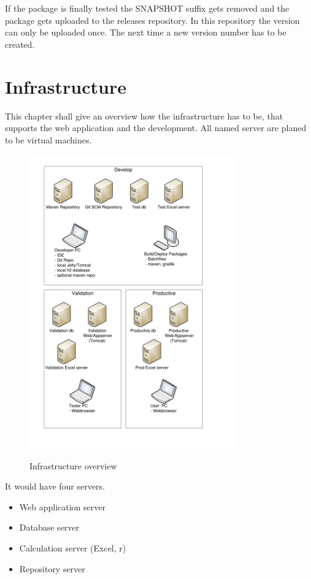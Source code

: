 \documentclass[paper=a4,twoside=false,BCOR=0mm,DIV=calc,fontsize=12pt]{scrartcl}
\begin{document}
If the package is finally tested the SNAPSHOT suffix gets removed and the package gets uploaded to the releases repository. In this repository the version can only be uploaded once. The next time a new version number has to be created.

\section{Infrastructure}
This chapter shall give an overview how the infrastructure has to be, that supports the web application and the development. 
All named server are planed to be virtual machines.

\begin{figure}
    \begin{center}
       \includegraphics[width=0.8\textwidth]{./img/InfrastructureLayout.pdf}\\
    \end{center}
  \caption{Infrastructure overview}
  \label{infrastructureoverview}
\end{figure} 

It would have four servers. 
\begin{itemize}
 \item Web application server
 \item Database server
 \item Calculation server (Excel, r)
 \item Repository server
\end{itemize}
\end{document}
